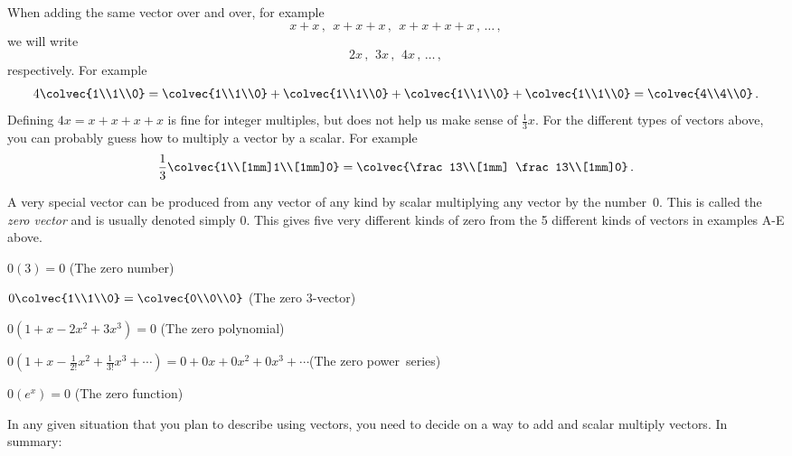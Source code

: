 When adding the same vector over and over, for example
\[
x+x\, ,\: \  x+x+x\, ,\:\    x+x+x+x\,  ,\, \ldots\, ,
\]
we will write
\[
2x\, ,\: \, 3x\, , \:\,  4x\, ,\, \ldots\, ,
\]
respectively. For example
\[
4\colvec{1\\1\\0}=\colvec{1\\1\\0}+\colvec{1\\1\\0}+\colvec{1\\1\\0}+\colvec{1\\1\\0}=\colvec{4\\4\\0}\, .
\]
Defining $4x=x+x+x+x$ is fine for integer multiples, but does not help us make sense of $\frac13 x$. For the different types of vectors 
above, you can probably guess how to multiply a vector by a scalar. For example
\[
\frac 13 \colvec{1\\[1mm]1\\[1mm]0} = \colvec{\frac13\\[1mm] \frac13\\[1mm]0}\, .
\]

 A very special vector can be produced from any vector of any kind by scalar multiplying any vector by the number~$0$. 
This is called the {\itshape zero vector} and is usually denoted simply $0$. This gives five very different kinds of zero from the 5 different kinds of vectors in   examples A-E above.
\begin{enumext}[label=\Alph*,wrap-label=(#1)]
\item $0(3)=0$ (The zero number)
\item $0\colvec{1\\1\\0}=\colvec{0\\0\\0} $ (The zero 3-vector)
\item $0\left(1+x-2x^2+3x^3\right)=0$ (The zero polynomial)
\item 
$0\!\left(  1+x\!-\!\frac1{2!}x^2\!+\!\frac1{3!}x^3\!+\cdots \!\right) \!
 =  0+0x+0x^2\!+0x^3\!+\cdots $(The zero power~series)
 \item $0\left(   e^x \right) =0$ (The zero function)
\end{enumext}

In any given situation that you plan to describe using vectors, you need to decide on a way to add and scalar multiply vectors.
In summary:
\vspace{3mm}
\begin{center}
\end{center}
\vspace{3mm}

